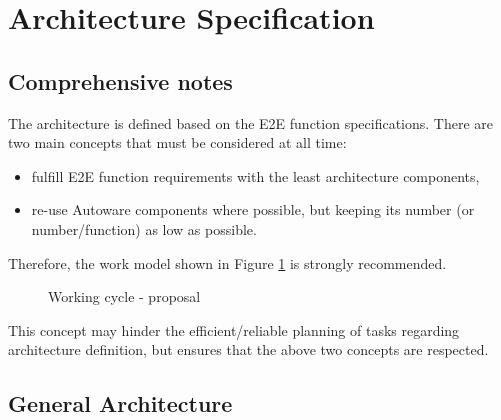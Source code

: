 \documentclass[sn-mathphys-num]{sn-jnl}%
\begin{document}
\section{Architecture Specification} \label{arch_spec}
\subsection{Comprehensive notes}
The architecture is defined based on the E2E function specifications. There are two main concepts that must be considered at all time:
\begin{itemize}
    \item fulfill E2E function requirements with the least architecture components,
    \item re-use Autoware components where possible, but keeping its number (or number/function) as low as possible.
\end{itemize}
Therefore, the work model shown in Figure \ref{fig:cycle} is strongly recommended.
\begin{figure}[h]
    \caption{Working cycle - proposal}
    \label{fig:cycle}
\end{figure}
This concept may hinder the efficient/reliable planning of tasks regarding architecture definition, but ensures that the above two concepts are respected.

\subsection{General Architecture}
\end{document}
